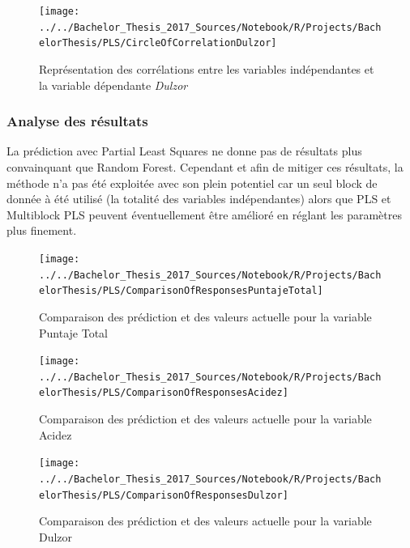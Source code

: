 \begin{figure}[H]
	\centering
	\texttt{[image: ../../Bachelor\_Thesis\_2017\_Sources/Notebook/R/Projects/BachelorThesis/PLS/CircleOfCorrelationDulzor]}
	\caption{Représentation des corrélations entre les variables indépendantes et la variable dépendante \textit{Dulzor}}
	\label{fig:circleofcorrelationdulzor}
\end{figure}


\subsubsection{Analyse des résultats}

La prédiction avec Partial Least Squares ne donne pas de résultats plus convainquant que Random Forest. Cependant et afin de mitiger ces résultats, la méthode n'a pas été exploitée avec son plein potentiel car un seul block de donnée à été utilisé (la totalité des variables indépendantes) alors que PLS et Multiblock PLS peuvent éventuellement être amélioré en réglant les paramètres plus finement. 

\begin{figure}[H]
	\centering
	\texttt{[image: ../../Bachelor\_Thesis\_2017\_Sources/Notebook/R/Projects/BachelorThesis/PLS/ComparisonOfResponsesPuntajeTotal]}
	\caption{Comparaison des prédiction et des valeurs actuelle pour la variable Puntaje Total}
	\label{fig:comparisonofresponsespuntajetotal}
\end{figure}


\begin{figure}[H]
	\centering
	\texttt{[image: ../../Bachelor\_Thesis\_2017\_Sources/Notebook/R/Projects/BachelorThesis/PLS/ComparisonOfResponsesAcidez]}
	\caption{Comparaison des prédiction et des valeurs actuelle pour la variable Acidez}
	\label{fig:comparisonofresponsesacidez}
\end{figure}



\begin{figure}[H]
	\centering
	\texttt{[image: ../../Bachelor\_Thesis\_2017\_Sources/Notebook/R/Projects/BachelorThesis/PLS/ComparisonOfResponsesDulzor]}
	\caption{Comparaison des prédiction et des valeurs actuelle pour la variable Dulzor}
	\label{fig:comparisonofresponsesdulzor}
\end{figure}



















